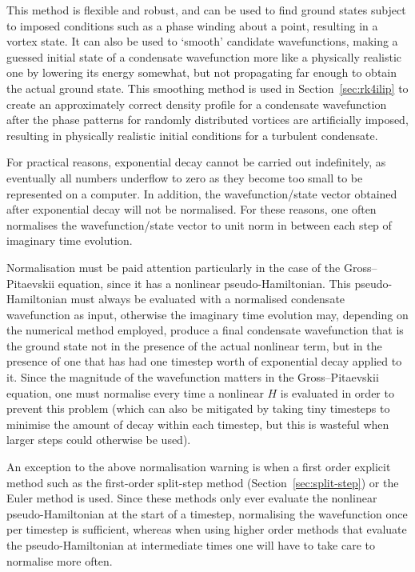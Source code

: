 This method is flexible and robust, and can be used to find ground states subject to imposed conditions such as a phase winding about a point, resulting in a vortex state. It can also be used to `smooth' candidate wavefunctions, making a guessed initial state of a condensate wavefunction more like a physically realistic one by lowering its energy somewhat, but not propagating far enough to obtain the actual ground state. This smoothing method is used in Section~\ref{sec:rk4ilip} to create an approximately correct density profile for a condensate wavefunction after the phase patterns for randomly distributed vortices are artificially imposed, resulting in physically realistic initial conditions for a turbulent condensate.  

For practical reasons, exponential decay cannot be carried out indefinitely, as eventually all numbers underflow to zero as they become too small to be represented on a computer. In addition, the wavefunction/state vector obtained after exponential decay will not be normalised. For these reasons, one often normalises the wavefunction/state vector to unit norm in between each step of imaginary time evolution.

Normalisation must be paid attention particularly in the case of the Gross--Pitaevskii equation, since it has a nonlinear pseudo-Hamiltonian. This pseudo-Hamiltonian must always be evaluated with a normalised condensate wavefunction as input, otherwise the imaginary time evolution may, depending on the numerical method employed, produce a final condensate wavefunction that is the ground state not in the presence of the actual nonlinear term, but in the presence of one that has had one timestep worth of exponential decay applied to it. Since the magnitude of the wavefunction matters in the Gross--Pitaevskii equation, one must normalise every time a nonlinear $H$ is evaluated in order to prevent this problem (which can also be mitigated by taking tiny timesteps to minimise the amount of decay within each timestep, but this is wasteful when larger steps could otherwise be used).

An exception to the above normalisation warning is when a first order explicit method such as the first-order split-step method (Section~\ref{sec:split-step}) or the Euler method is used. Since these methods only ever evaluate the nonlinear pseudo-Hamiltonian at the start of a timestep, normalising the wavefunction once per timestep is sufficient, whereas when using higher order methods that evaluate the pseudo-Hamiltonian at intermediate times one will have to take care to normalise more often.

